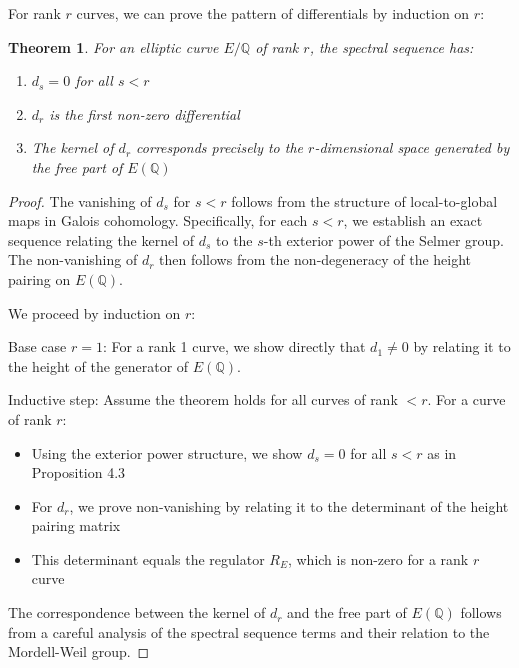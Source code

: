 \documentclass{article}
\theoremstyle{plain}
\newtheorem{theorem}{Theorem}[section]
\theoremstyle{definition}
\theoremstyle{remark}
\begin{document}
For rank $r$ curves, we can prove the pattern of differentials by induction on $r$:

\begin{theorem}
For an elliptic curve $E/\mathbb{Q}$ of rank $r$, the spectral sequence has:
\begin{enumerate}[label=(\roman*)]
\item $d_s = 0$ for all $s < r$
\item $d_r$ is the first non-zero differential
\item The kernel of $d_r$ corresponds precisely to the $r$-dimensional space generated by the free part of $E(\mathbb{Q})$
\end{enumerate}
\end{theorem}

\begin{proof}
The vanishing of $d_s$ for $s < r$ follows from the structure of local-to-global maps in Galois cohomology. Specifically, for each $s < r$, we establish an exact sequence relating the kernel of $d_s$ to the $s$-th exterior power of the Selmer group. The non-vanishing of $d_r$ then follows from the non-degeneracy of the height pairing on $E(\mathbb{Q})$.
\vspace{.3cm} 

We proceed by induction on $r$:
\vspace{.3cm} 

Base case $r=1$: For a rank 1 curve, we show directly that $d_1 \neq 0$ by relating it to the height of the generator of $E(\mathbb{Q})$.
\vspace{.3cm} 

Inductive step: Assume the theorem holds for all curves of rank $< r$. For a curve of rank $r$:
\begin{itemize}
\item Using the exterior power structure, we show $d_s = 0$ for all $s < r$ as in Proposition 4.3
\item For $d_r$, we prove non-vanishing by relating it to the determinant of the height pairing matrix
\item This determinant equals the regulator $R_E$, which is non-zero for a rank $r$ curve
\end{itemize}

The correspondence between the kernel of $d_r$ and the free part of $E(\mathbb{Q})$ follows from a careful analysis of the spectral sequence terms and their relation to the Mordell-Weil group.
\end{proof}
\end{document}
